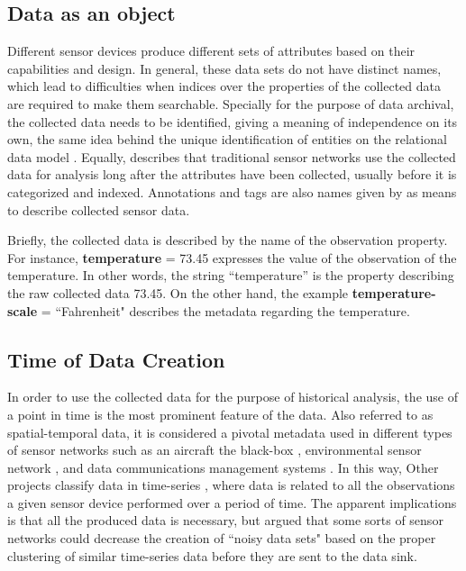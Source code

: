 \subsection{Data as an object}

Different sensor devices produce different sets of attributes based on their
capabilities and design. In general, these data sets do not have distinct
names, which lead to difficulties when indices over the properties of the
collected data are required to make them searchable. Specially for the purpose
of data archival, the collected data needs to be identified, giving a meaning
of independence on its own, the same idea behind the unique identification of
entities on the relational data model \cite{relational-model}. Equally,
\cite{sn-provenance} describes that traditional sensor networks use the
collected data for analysis long after the attributes have been collected,
usually before it is categorized and indexed. Annotations and tags are also
names given by \cite{sn-provenance} as means to describe collected sensor data.

Briefly, the collected data is described by the name of the observation
property. For instance, \textbf{temperature} = 73.45 expresses the value of the
observation of the temperature. In other words, the string ``temperature'' is
the property describing the raw collected data 73.45. On the other hand,
the example \textbf{temperature-scale} = ``Fahrenheit" describes the metadata
regarding the temperature.

\subsection{Time of Data Creation}

In order to use the collected data for the purpose of historical analysis, the
use of a point in time is the most prominent feature of the data. Also referred to
as spatial-temporal data, it is considered a pivotal metadata used in different
types of sensor networks such as an aircraft the black-box
\cite{sn-exemple-blackbox}, environmental sensor network \cite{sfbeams2006},
and data communications management systems \cite{sn-dataware-house}. In this
way, Other projects classify data in time-series \cite{sn-time-series-example},
where data is related to all the observations a given sensor device performed
over a period of time. The apparent implications is that all the produced data
is necessary, but \cite{sn-time-series} argued that some sorts of sensor
networks could decrease the creation of ``noisy data sets" based on the proper
clustering of similar time-series data before they are sent to the data
sink.


